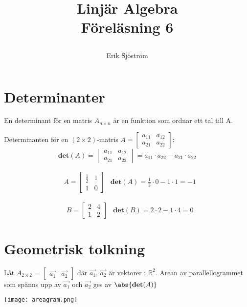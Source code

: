 
\title{
	 Linjär Algebra\\
	 Föreläsning 6
    \author{Erik Sjöström}
}

\maketitle

\section{Determinanter} %
\label{sec:matrisvektorprodukt}

En determinant för en matris $A_{n \times n}$ är en funktion som ordnar ett tal till A.
\begin{Def}
    Determinanten för en $(2 \times 2)$-matris $A = \begin{bmatrix} a_{11}&a_{12}\\a_{21}&a_{22} \end{bmatrix}$:
    \[
        \mathbf{det}(A) = \begin{vmatrix} a_{11}&a_{12}\\a_{21}&a_{22} \end{vmatrix} = a_{11} \cdot a_{22} - a_{21} \cdot a_{22}
    \]
\end{Def}
\begin{Ex}
    \begin{align*}
    &A = \begin{bmatrix} \frac{1}{2}&1\\1&0 \end{bmatrix} &\mathbf{det}(A) = \frac{1}{2} \cdot 0 - 1 \cdot 1 = -1
    \end{align*}
\end{Ex}

\begin{Ex}
    \begin{align*}
    &B = \begin{bmatrix} 2&4\\1&2 \end{bmatrix} & \mathbf{det}(B) = 2 \cdot 2 - 1 \cdot 4 = 0
    \end{align*}
\end{Ex}
\newpage
\section{Geometrisk tolkning} %
\label{sec:geometrisk_tolkning}
\begin{sats}
    Låt $A_{2 \times 2}$ = $\begin{bmatrix} \vec{a_1} &\vec{a_2} \end{bmatrix}$ där $\vec{a_1}$, $\vec{a_2}$ är vektorer i $\mathbb{R}^2$. Arean av parallellogrammet som spänns upp av $\vec{a_1}$ och $\vec{a_2}$ ges av $\abs{\mathbf{det}(A)}$
    \begin{center}
        \texttt{[image: areagram.png]}
    \end{center}
\end{sats}

